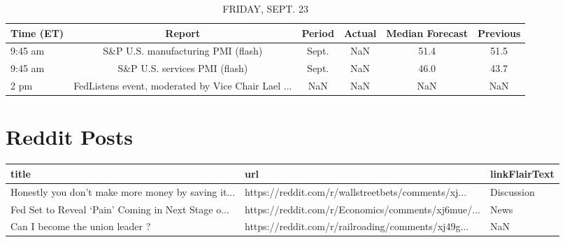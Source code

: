 \documentclass{book}
\begin{document}
  
  \begin{table}[htbp]%
  \caption{FRIDAY, SEPT. 23}%
  \centering%
  \begin{adjustbox}{width=1\textwidth}%
  \begin{tabular}{lccccc}
  \toprule
  Time (ET) &                                             Report & Period & Actual & Median Forecast & Previous \\
  \midrule
    9:45 am &                 S\&P U.S. manufacturing PMI (flash) &  Sept. &    NaN &            51.4 &     51.5 \\
    9:45 am &                      S\&P U.S. services PMI (flash) &  Sept. &    NaN &            46.0 &     43.7 \\
       2 pm & FedListens event, moderated by Vice Chair Lael ... &    NaN &    NaN &             NaN &      NaN \\
  \bottomrule
  \end{tabular}
  \end{adjustbox}%
  \end{table}
  
  \section{Reddit Posts}%
  \label{sec:RedditPosts}%
  
  
  \begin{table}[htbp]%
  \centering%
  \begin{adjustbox}{width=1\textwidth}%
  \begin{tabular}{lll}
  \toprule
                                               title &                                                url & linkFlairText \\
  \midrule
  Honestly you don’t make more money by saving it... & https://reddit.com/r/wallstreetbets/comments/xj... &    Discussion \\
  Fed Set to Reveal ‘Pain’ Coming in Next Stage o... & https://reddit.com/r/Economics/comments/xj6mue/... &          News \\
                     Can I become the union leader ? & https://reddit.com/r/railroading/comments/xj49g... &           NaN \\
  \bottomrule
  \end{tabular}
  \end{adjustbox}%
  \end{table}
  
  
  
\end{document}
